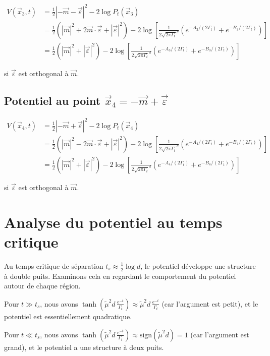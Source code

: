 \documentclass[11pt,a4paper]{article}
\begin{document}
\begin{align}
V(\vec{x}_3, t) &= \frac{1}{2}|-\vec{m} - \vec{\varepsilon}|^2 - 2\log P_t(\vec{x}_3) \\
&= \frac{1}{2}(|\vec{m}|^2 + 2\vec{m}\cdot\vec{\varepsilon} + |\vec{\varepsilon}|^2) - 2\log\left[\frac{1}{2\sqrt{2\pi\Gamma_t}^d}\left(e^{-A_3/(2\Gamma_t)} + e^{-B_3/(2\Gamma_t)}\right)\right] \\
&= \frac{1}{2}(|\vec{m}|^2 + |\vec{\varepsilon}|^2) - 2\log\left[\frac{1}{2\sqrt{2\pi\Gamma_t}^d}\left(e^{-A_3/(2\Gamma_t)} + e^{-B_3/(2\Gamma_t)}\right)\right]
\end{align}

si $\vec{\varepsilon}$ est orthogonal à $\vec{m}$.

\subsection{Potentiel au point $\vec{x}_4 = -\vec{m} + \vec{\varepsilon}$}

\begin{align}
V(\vec{x}_4, t) &= \frac{1}{2}|-\vec{m} + \vec{\varepsilon}|^2 - 2\log P_t(\vec{x}_4) \\
&= \frac{1}{2}(|\vec{m}|^2 - 2\vec{m}\cdot\vec{\varepsilon} + |\vec{\varepsilon}|^2) - 2\log\left[\frac{1}{2\sqrt{2\pi\Gamma_t}^d}\left(e^{-A_4/(2\Gamma_t)} + e^{-B_4/(2\Gamma_t)}\right)\right] \\
&= \frac{1}{2}(|\vec{m}|^2 + |\vec{\varepsilon}|^2) - 2\log\left[\frac{1}{2\sqrt{2\pi\Gamma_t}^d}\left(e^{-A_4/(2\Gamma_t)} + e^{-B_4/(2\Gamma_t)}\right)\right]
\end{align}

si $\vec{\varepsilon}$ est orthogonal à $\vec{m}$.

\section{Analyse du potentiel au temps critique}

Au temps critique de séparation $t_s \approx \frac{1}{2}\log d$, le potentiel développe une structure à double puits. Examinons cela en regardant le comportement du potentiel autour de chaque région.

Pour $t \gg t_s$, nous avons $\tanh\left(\tilde{\mu}^2 d \, \frac{e^{-t}}{\Gamma_t}\right) \approx \tilde{\mu}^2 d \, \frac{e^{-t}}{\Gamma_t}$ (car l'argument est petit), et le potentiel est essentiellement quadratique.

Pour $t \ll t_s$, nous avons $\tanh\left(\tilde{\mu}^2 d \, \frac{e^{-t}}{\Gamma_t}\right) \approx \text{sign}(\tilde{\mu}^2 d) = 1$ (car l'argument est grand), et le potentiel a une structure à deux puits.
\end{document}
